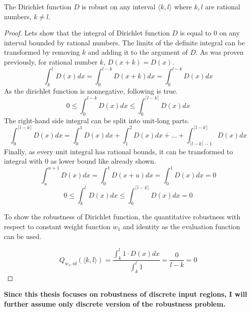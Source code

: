 \begin{lemma}{The Dirichlet function $D$ is robust on any interval $\langle k, l\rangle$
    where $k, l$ are rational numbers, $k\neq l$.}
\begin{proof}

        Lets show that the integral of Dirichlet function $D$ is equal
        to $0$ on any interval bounded by rational numbers.
        The limits of the definite integral can be transformed by removing $k$
        and adding it to the argument of $D$. As was proven previously,
        for rational number $k$, $D(x+k) = D(x)$.
        \begin{equation*}
            \int_{k}^{l} D(x) dx = \int_{0}^{l-k} D(x+k) dx = \int_{0}^{l-k} D(x) dx
        \end{equation*}
        As the dirichlet function is nonnegative, following is true.
        \begin{equation*}
            0 \leq \int_0^{l-k} D(x) dx \leq \int_0^{\lceil l-k \rceil} D(x) dx
        \end{equation*}
        The right-hand side integral can be split into unit-long parts.
        \begin{equation*}
            \int_0^{\lceil l-k\rceil} D(x) dx
            = \int_0^1 D(x) dx + \int_1^2 D(x) dx + \ldots
                + \int_{\lceil l-k \rceil-1}^{\lceil l-k \rceil} D(x) dx
        \end{equation*}
        Finally, as every unit integral has rational bounds,
        it can be transformed to integral with 0 as lower bound like already shown.
        \begin{equation*}
            \int_u^{u+1} D(x) dx = \int_0^1 D(x+u) dx = \int_0^1 D(x) dx = 0
        \end{equation*}
        \begin{equation*}
            0 \leq \int_{k}^{l} D(x) dx \leq \int_0^{\lceil l-k \rceil} D(x) dx = 0
        \end{equation*}

        To show the robustness of Dirichlet function, the quantitative robustness
        with respect to constant weight function $w_1$
        and identity as the evaluation function can be used.

        \begin{equation*}
            Q_{w_1, id}(\langle k, l\rangle)
            = \frac{\int_{k}^{l} 1\cdot D(x) dx}{\int_{k}^{l} 1} = \frac{0}{l-k} = 0
        \end{equation*}
    \end{proof}
\end{lemma}

\noindent\textbf{%
Since this thesis focuses on robustness of discrete input regions,
I will further assume only discrete version of the robustness problem.%
}

